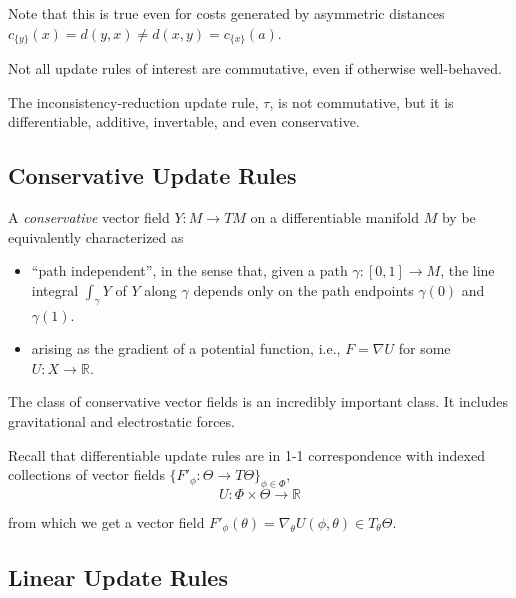 \documentclass{article}
\begin{document}
Note that this is true even for costs generated by asymmetric distances $c_{\{y\}}(x) = d(y, x) \ne d(x,y) = c_{\{x\}}(a)$.

Not all update rules of interest are commutative, even if otherwise well-behaved.

\begin{example}
    The inconsistency-reduction update rule, $\tau$, is not commutative, but it is differentiable, additive, invertable, and even conservative.
\end{example}


\subsection{Conservative Update Rules}

A \emph{conservative} vector field $Y : M \to T M$ on a differentiable manifold $M$ by be equivalently characterized as
\begin{itemize}
    \item ``path independent'', in the sense that, given a path $\gamma : [0,1] \to M$, the line integral
    $\int_\gamma Y$ of $Y$ along $\gamma$
     depends only on the path endpoints $\gamma(0)$ and $\gamma(1)$.
    \item
        arising as the gradient of a potential function, i.e., $F = \nabla U$ for some $U : X \to \mathbb R$.
\end{itemize}
The class of conservative vector fields is an incredibly important class.
It includes gravitational and electrostatic forces.

Recall that differentiable update rules are in 1-1 correspondence with indexed
collections of vector fields $\{ F'_\phi : \Theta \to T\Theta \}_{\phi \in \Phi}$,
\[
    U : \Phi \times \Theta\to \mathbb R
\]

from which we get a vector field $F'_\phi(\theta) = \nabla_{\theta} U(\phi, \theta) \in T_{\theta} \Theta$.


\subsection{Linear Update Rules}
\end{document}
